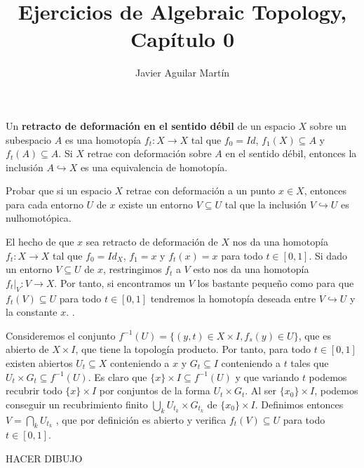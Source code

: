 \documentclass[twoside]{article}
\begin{document}
\title{Ejercicios de Algebraic Topology, Capítulo 0}
\author{Javier Aguilar Martín}
\maketitle

\begin{lemma}[Ejercicio 0.4]
Un \textbf{retracto de deformación en el sentido débil} de un espacio $X$ sobre un subespacio $A$ es una homotopía $f_t:X\to X$ tal que $f_0=Id$, $f_1(X)\subseteq A$ y $f_t(A)\subseteq A$. Si $X$ retrae con deformación sobre $A$ en el sentido débil, entonces la inclusión $A\hookrightarrow X$ es una equivalencia de homotopía. 

\end{lemma}



\begin{ejercicio}{0.5}
Probar que si un espacio $X$ retrae con deformación a un punto $x\in X$, entonces para cada entorno $U$ de $x$ existe un entorno $V\subseteq U$ tal que la inclusión $V\hookrightarrow U$ es nulhomotópica.
\end{ejercicio}

\begin{solucion}
El hecho de que $x$ sea retracto de deformación de $X$ nos da una homotopía $f_t:X\to X$ tal que $f_0=Id_X$, $f_1=x$ y $f_t(x)=x$ para todo $t\in[0,1]$. Si dado un entorno $V\subseteq U$ de $x$, restringimos $f_t$ a $V$ esto nos da una homotopía $f_t|_V: V\to X$. Por tanto, si encontramos un $V$ los bastante pequeño como para que $f_t(V)\subseteq U$ para todo $t\in [0,1]$ tendremos la homotopía deseada entre $V\hookrightarrow U$ y la constante $x$. . 

Consideremos el conjunto $f^{-1}(U)=\{(y,t)\in X\times I, f_s(y)\in U\}$, que es abierto de $X\times I$, que tiene la topología producto. Por tanto, para todo $t\in [0,1]$ existen abiertos $U_t\subseteq X$ conteniendo a $x$ y $G_t\subseteq I$ conteniendo a $t$ tales que $U_t\times G_t\subseteq f^{-1}(U)$. Es claro que $\{x\}\times I\subseteq f^{-1}(U)$ y que variando $t$ podemos recubrir todo $\{x\}\times I$ por conjuntos de la forma $U_t\times G_t$. Al ser $\{x_0\}\times I$, podemos conseguir un recubrimiento finito $\bigcup_k U_{t_k}\times G_{t_k}$ de $\{x_0\}\times I$. Definimos entonces $V=\bigcap_k U_{t_k}$ , que por definición es abierto y verifica $f_t(V)\subseteq U$ para todo $t\in [0,1]$. 

HACER DIBUJO
 
\end{solucion}
\end{document}
